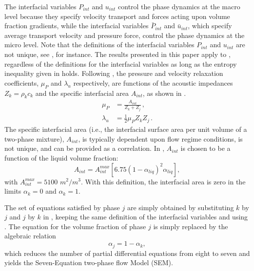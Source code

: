 %
The interfacial variables $P_{int}$ and $u_{int}$ control the phase dynamics at the macro level because they specify velocity transport
and forces acting upon volume fraction gradients, while the interfacial variables $\bar{P}_{int}$ and $\bar{u}_{int}$, which specify 
average transport velocity and pressure force, control the phase dynamics at the micro level.  Note that the definitions of the interfacial 
variables $P_{int}$ and 
$u_{int}$ are not unique, see \cite{BaerNunziato,GallouetHerardSeguin,Berry_2005}, for instance. 
The results presented in this paper apply to ,
regardless of the definitions for the interfacial variables as long as the entropy inequality given in  holds. 
Following \cite{SEM}, the pressure and velocity relaxation coefficients, $\mu_P$  and $\lambda_u$ respectively, are functions of the acoustic 
impedances $Z_k = \rho_k c_k$ and the specific interfacial area $A_{int}$, as shown in .
%
\begin{subequations}
\label{eq:relaxation_coeff}
\begin{align}
  \label{E-R:86}
  \mu_P &= \frac{A_{int}}{Z_{k}+Z_{j}}       \,,
  \\
  \label{E-R:85}
  \lambda_u &= \frac{1}{2} \mu_P Z_{k} Z_{j} \,.
\end{align}
\end{subequations}
%
The specific interfacial area (i.e., the interfacial surface area per unit volume of a two-phase mixture), $A_{int}$, is typically 
dependent upon flow regime conditions, is not unique, and can be provided as a correlation.
In \cite{SEM}, $A_{int}$ is chosen to be a function of the liquid volume fraction:
%
\begin{equation}\label{eq:Aint-sect4}
A_{int} = A_{int}^{max} \left[ 6.75 \left(1-\alpha_{liq} \right)^2 \alpha_{liq} \right],
\end{equation}
% 
with $A_{int}^{max} = 5100$ $m^2 / m^3$. With this definition, the interfacial area is zero in the limits $\alpha_{k} = 0$ and $\alpha_{k} = 1$.

The set of equations satisfied by phase $j$ are simply obtained by substituting $k$ by $j$ and $j$ by $k$ in , keeping 
the same definition of the interfacial variables and using . The equation for the volume fraction of phase $j$ is simply 
replaced by the algebraic relation
%
\begin{equation}
 \alpha_{j}= 1 - \alpha_{k}, 
\end{equation}
%
which reduces the number of partial differential equations from eight to seven and yields the Seven-Equation two-phase flow Model (SEM). 
%
